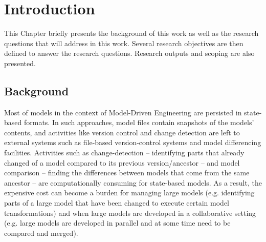 \documentclass[12pt, a4paper]{report} \usepackage[titletoc]{appendix}
\begin{document}
\tableofcontents
{}

\listoffigures
\newpage
 
\listoftables
\newpage

\lstlistoflistings
\newpage

\chapter{Introduction}
\label{ch:introduction}
This Chapter briefly presents the background of this work as well as the research questions that will address in this work. Several research objectives are then defined to answer the research questions. Research outputs and scoping are also presented. 

\section{Background}
\label{sec:background}
Most of models in the context of Model-Driven Engineering are persisted in state-based formats. In such approaches, model files contain snapshots of the models' contents, and activities like version control and change detection are left to external systems such as file-based version-control systems and model differencing facilities. Activities such as change-detection -- identifying parts that already changed of a model compared to its previous version/ancestor -- and model comparison -- finding the differences between models that come from the same ancestor -- are computationally consuming for state-based models. As a result, the expensive cost can become a burden for managing large models (e.g. identifying parts of a large model that have been changed to execute certain model transformations) and when large models are developed in a collaborative setting (e.g. large models are developed in parallel and at some time  need to be compared and merged).
\end{document}
